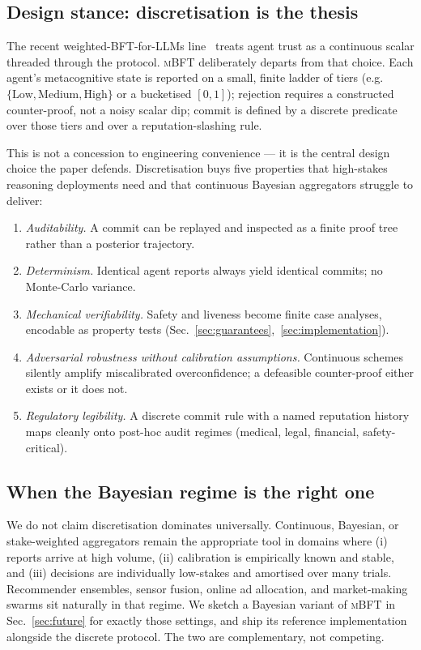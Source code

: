\documentclass[11pt,conference]{IEEEtran}
\newcommand{\mbft}{\textsc{mBFT}}
\begin{document}
\subsection*{Design stance: discretisation is the thesis}
The recent weighted-BFT-for-LLMs line~\cite{wang2025wbft, aegean2025}
treats agent trust as a continuous scalar threaded through the
protocol. \mbft{} deliberately departs from that choice. Each agent's
metacognitive state is reported on a small, finite ladder of tiers
(e.g.~$\{\text{Low}, \text{Medium}, \text{High}\}$ or a bucketised
$[0,1]$); rejection requires a constructed counter-proof, not a noisy
scalar dip; commit is defined by a discrete predicate over those tiers
and over a reputation-slashing rule.

This is not a concession to engineering convenience --- it is the
central design choice the paper defends. Discretisation buys five
properties that high-stakes reasoning deployments need and that
continuous Bayesian aggregators struggle to deliver:
\begin{enumerate}
  \item \emph{Auditability.} A commit can be replayed and inspected as
        a finite proof tree rather than a posterior trajectory.
  \item \emph{Determinism.} Identical agent reports always yield
        identical commits; no Monte-Carlo variance.
  \item \emph{Mechanical verifiability.} Safety and liveness become
        finite case analyses, encodable as property tests
        (Sec.~\ref{sec:guarantees},~\ref{sec:implementation}).
  \item \emph{Adversarial robustness without calibration assumptions.}
        Continuous schemes silently amplify miscalibrated overconfidence;
        a defeasible counter-proof either exists or it does not.
  \item \emph{Regulatory legibility.} A discrete commit rule with a
        named reputation history maps cleanly onto post-hoc audit
        regimes (medical, legal, financial, safety-critical).
\end{enumerate}

\subsection*{When the Bayesian regime is the right one}
We do not claim discretisation dominates universally. Continuous,
Bayesian, or stake-weighted aggregators remain the appropriate tool in
domains where (i) reports arrive at high volume, (ii) calibration is
empirically known and stable, and (iii) decisions are individually
low-stakes and amortised over many trials. Recommender ensembles,
sensor fusion, online ad allocation, and market-making swarms sit
naturally in that regime. We sketch a Bayesian variant of \mbft{} in
Sec.~\ref{sec:future} for exactly those settings, and ship its
reference implementation alongside the discrete protocol. The two are
complementary, not competing.
\end{document}
